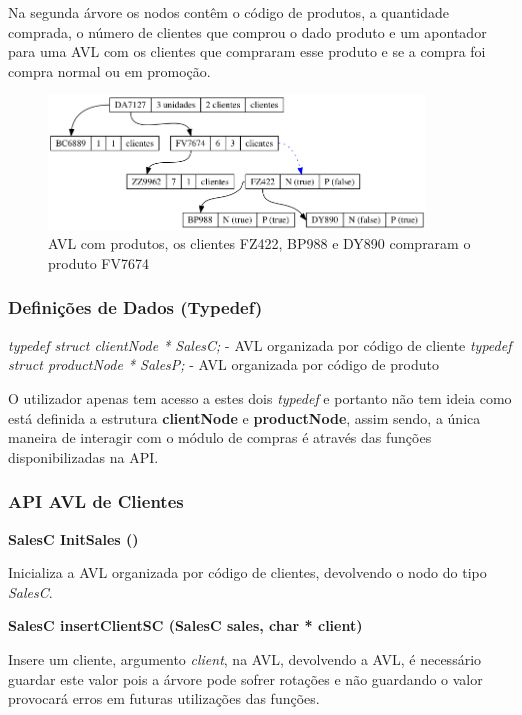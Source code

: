 \documentclass[10pt] {article}
\begin{document}
\par Na segunda árvore os nodos contêm o código de produtos, a quantidade comprada, o número de clientes que 
 comprou o dado produto e um apontador para uma AVL com os clientes que compraram esse produto e se a 
 compra foi compra normal ou em promoção.

\begin{figure}[ht!]
\centering
\includegraphics[width=100mm]{avl_salesp.png}
\caption{AVL com produtos, os clientes FZ422, BP988 e DY890 compraram o produto FV7674}
\end{figure}
 
 \subsubsection{Definições de Dados (Typedef)}
 \emph{typedef struct clientNode * SalesC;} - AVL organizada por código de cliente
 \emph{typedef struct productNode * SalesP;} - AVL organizada por código de produto
 \par O utilizador apenas tem acesso a estes dois \emph{typedef} e portanto não tem ideia como está definida a 
 estrutura \textbf{clientNode} e \textbf{productNode}, assim sendo, a única maneira de interagir com o módulo de 
 compras é através das funções disponibilizadas na API.
 
 \subsubsection{API AVL de Clientes}
\noindent \textbf {SalesC InitSales ()}
\par Inicializa a AVL organizada por código de clientes, devolvendo o nodo do tipo \emph{SalesC}.

\noindent \textbf {SalesC insertClientSC (SalesC sales, char * client)}
\par Insere um cliente, argumento \emph{client}, na AVL, devolvendo a AVL, é necessário guardar este valor
pois a árvore pode sofrer rotações e não guardando o valor provocará erros em futuras utilizações das funções. \\
\end{document}
